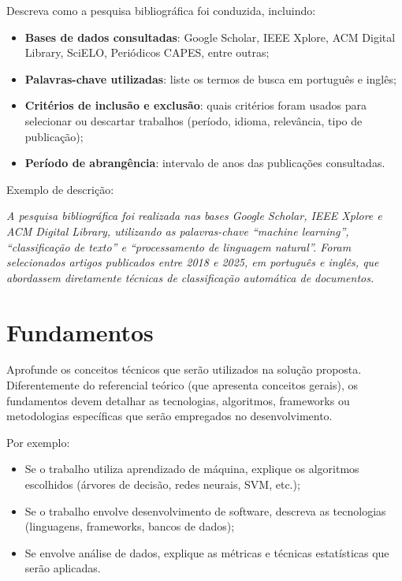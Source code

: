 \documentclass[
    12pt,                %
    openright,           %
    oneside,             %
    a4paper,             %
    english,             %
    brazil               %
]{abntex2}
\begin{document}
Descreva como a pesquisa bibliográfica foi conduzida, incluindo:

\begin{itemize}
    \item \textbf{Bases de dados consultadas}: Google Scholar, IEEE Xplore, ACM Digital Library, SciELO, Periódicos CAPES, entre outras;
    \item \textbf{Palavras-chave utilizadas}: liste os termos de busca em português e inglês;
    \item \textbf{Critérios de inclusão e exclusão}: quais critérios foram usados para selecionar ou descartar trabalhos (período, idioma, relevância, tipo de publicação);
    \item \textbf{Período de abrangência}: intervalo de anos das publicações consultadas.
\end{itemize}

Exemplo de descrição:

\textit{A pesquisa bibliográfica foi realizada nas bases Google Scholar, IEEE Xplore e ACM Digital Library, utilizando as palavras-chave ``machine learning'', ``classificação de texto'' e ``processamento de linguagem natural''. Foram selecionados artigos publicados entre 2018 e 2025, em português e inglês, que abordassem diretamente técnicas de classificação automática de documentos.}

\section{Fundamentos}
\label{sec:fundamentos}

Aprofunde os conceitos técnicos que serão utilizados na solução proposta. Diferentemente do referencial teórico (que apresenta conceitos gerais), os fundamentos devem detalhar as tecnologias, algoritmos, frameworks ou metodologias específicas que serão empregados no desenvolvimento.

Por exemplo:
\begin{itemize}
    \item Se o trabalho utiliza aprendizado de máquina, explique os algoritmos escolhidos (árvores de decisão, redes neurais, SVM, etc.);
    \item Se o trabalho envolve desenvolvimento de software, descreva as tecnologias (linguagens, frameworks, bancos de dados);
    \item Se envolve análise de dados, explique as métricas e técnicas estatísticas que serão aplicadas.
\end{itemize}
\end{document}
